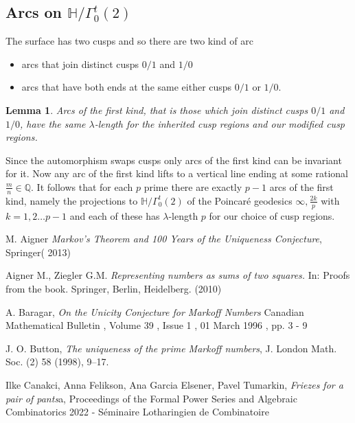 \documentclass[12pt,a4paper]{amsart}
\newtheorem{lem}[thm]{Lemma}
\def\HH{\mathbb{H}}
\def\ah{\Gamma_0^t(2)}
\def\oot{\HH / \ah}
\def\QQ{\mathbb{Q}}
\begin{document}
\subsection{Arcs on $\oot$}

The surface has two cusps and so there are two kind of arc
\begin{itemize}
	\item arcs that join distinct cusps $0/1$ and $1/0$
	\item arcs that have both ends at the same either
		cusps $0/1$ or $1/0$.
\end{itemize}

\begin{lem}
Arcs of the first kind,
that is those which join distinct cusps $0/1$ and $1/0$,
have the same $\lambda$-length for the inherited
cusp regions and our modified cusp regions. 
\end{lem}


Since the automorphism swaps cusps only arcs of the first  kind can be invariant for it.
Now any arc of the first kind lifts to a vertical line ending at
some rational $\frac{m}{n}\in \QQ$.
It follows that for each  $p$  prime there are exactly $p-1$ arcs of the first kind,
namely the projections to $\oot$ of the Poincaré geodesics  $\infty,
\frac{2k}{p}$ with  $k = 1,2\ldots p-1$
and each of these has $\lambda$-length $p$ for our choice of cusp regions.



M. Aigner
\textit{Markov's Theorem and 100 Years of the Uniqueness Conjecture}, Springer( 2013)

Aigner M., Ziegler G.M.  
\textit{Representing numbers as sums of two squares.} In: Proofs from the book. Springer, Berlin, Heidelberg. (2010)

A. Baragar,
\textit{On the Unicity Conjecture for Markoff Numbers}
Canadian Mathematical Bulletin , Volume 39 , Issue 1 , 01 March 1996 , pp. 3 - 9

J. O. Button, 
\textit{The uniqueness of the prime Markoff numbers},
 J. London Math. Soc.
(2) 58 (1998), 9–17.

Ilke Canakci, Anna Felikson, Ana Garcia Elsener, Pavel Tumarkin,
\textit{Friezes for a pair of pants}a,
Proceedings of the Formal Power Series and Algebraic Combinatorics 2022 - Séminaire Lotharingien de Combinatoire
\end{document}
